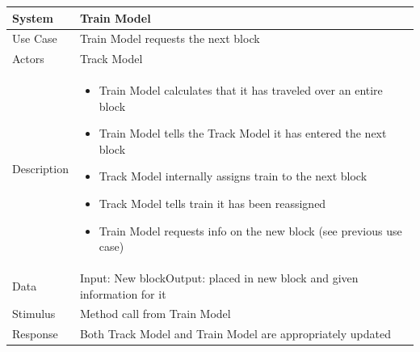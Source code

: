 \documentclass{article}
\begin{document}
    \begin{longtable}{
    || >{\raggedright\arraybackslash}m{}
    | >{\raggedright\arraybackslash}m{}||}
    \hline
    \textbf{System} &  \textbf{Train Model} \\
    \hline
    Use Case & Train Model requests the next block\\
    \hline
    Actors & Track Model\\
    \hline
    Description & \begin{itemize}
        \item Train Model calculates that it has traveled over an entire block
        \item Train Model tells the Track Model it has entered the next block
        \item Track Model internally assigns train to the next block
        \item Track Model tells train it has been reassigned
        \item Train Model requests info on the new block (see previous use case)
    \end{itemize}\\
    \hline
    Data & Input: New block\newline Output: placed in new block and given information for it\\
    \hline
    Stimulus & Method call from Train Model\\
    \hline
    Response & Both Track Model and Train Model are appropriately updated\\
    \hline
    \end{longtable}
    
\end{document}
